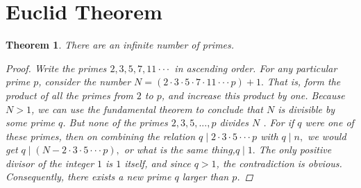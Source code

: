 \documentclass[12pt]{article}
\newtheorem{thm}{Theorem}[section]
\begin{document}
\newpage
\section{Euclid Theorem}

\begin{thm}\textit{There are an infinite number of primes.}
\begin{proof}
Write the primes $2, 3, 5, 7, 11\cdot\cdot\cdot $ in ascending order. For any particular prime $p$, consider the number
                       $ N= (2\cdot3\cdot5\cdot7\cdot11\cdot\cdot\cdot p) +1.$
That is, form the product of all the primes from $2$ to $p$, and increase this product by one. Because $N>1$, we can use the fundamental theorem to conclude that $N$ is divisible by some prime $q$. But none of the primes $2, 3, 5,..., p$ divides $N$ . For if $q$ were one of these primes, then on combining the relation $ q\mid2\cdot3\cdot5\cdot\cdot\cdot p$ with $q\mid n,$ we would get $ q\mid(N-2\cdot3\cdot5\cdot\cdot\cdot p),$ or what is the same thing,$ q\mid1.$ The only positive divisor of the integer $1$ is $1$ itself, and since $q>1$, the contradiction is obvious. Consequently, there exists a new prime $q$ larger than $p$.
\end{proof}
\end{thm}
\end{document}
